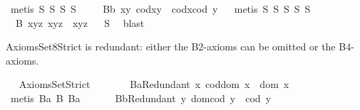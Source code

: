 \begin{isabellebody}
\ {\isacharparenleft}metis\ S{}\ S{}\ S{}\ S{}{\isacharparenright}%
\endisatagproof
{\isafoldproof}%
%
\isadelimproof
%
\endisadelimproof
\isanewline
\ \ \ \isamarkupfalse%
\ B{}b{\isacharcolon}\ {\isachardoublequoteopen}\isactrlbold {\isasymforall}x{\isachardot}\isactrlbold {\isasymforall}y{\isachardot}\ cod{\isacharparenleft}x{\isasymcdot}y{\isacharparenright}\ {\isasymcong}\ cod{\isacharparenleft}x{\isasymcdot}{\isacharparenleft}cod\ y{\isacharparenright}{\isacharparenright}{\isachardoublequoteclose}%
\isadelimproof
\ %
\endisadelimproof
%
\isatagproof
{}\isamarkupfalse%
\ {\isacharparenleft}metis\ S{}\ S{}\ S{}\ S{}\ S{}{\isacharparenright}%
\endisatagproof
{\isafoldproof}%
%
\isadelimproof
%
\endisadelimproof
\isanewline
\ \ \ \isamarkupfalse%
\ \ B{}{\isacharcolon}\ {\isachardoublequoteopen}\isactrlbold {\isasymforall}x{\isachardot}\isactrlbold {\isasymforall}y{\isachardot}\isactrlbold {\isasymforall}z{\isachardot}\ x{\isasymcdot}{\isacharparenleft}y{\isasymcdot}z{\isacharparenright}\ {\isasymcong}\ {\isacharparenleft}x{\isasymcdot}y{\isacharparenright}{\isasymcdot}z{\isachardoublequoteclose}%
\isadelimproof
\ %
\endisadelimproof
%
\isatagproof
{}\isamarkupfalse%
\ S{}\ \isamarkupfalse%
\ blast%
\endisatagproof
{\isafoldproof}%
%
\isadelimproof
%
\endisadelimproof
\isanewline
\ \ \isamarkupfalse%
%
\isamarkuptrue%
%
\begin{isamarkuptext}%
AxiomsSet8Strict is redundant: either the B2-axioms can be omitted or the B4-axioms.%
\end{isamarkuptext}\isamarkuptrue%
\ \isamarkupfalse%
\ AxiomsSet{}Strict\isanewline
\ \ \isanewline
\ \ \ \isamarkupfalse%
\ B{}aRedundant{\isacharcolon}\ {\isachardoublequoteopen}\isactrlbold {\isasymforall}x{\isachardot}\ cod{\isacharparenleft}dom\ x{\isacharparenright}\ {\isasymcong}\ dom\ x\ {\isachardoublequoteclose}%
\isadelimproof
\ %
\endisadelimproof
%
\isatagproof
{}\isamarkupfalse%
\ {\isacharparenleft}metis\ B{}a\ B{}\ B{}a{\isacharparenright}%
\endisatagproof
{\isafoldproof}%
%
\isadelimproof
%
\endisadelimproof
\ \isanewline
\ \ \ \isamarkupfalse%
\ B{}bRedundant{\isacharcolon}\ {\isachardoublequoteopen}\isactrlbold {\isasymforall}y{\isachardot}\ dom{\isacharparenleft}cod\ y{\isacharparenright}\ {\isasymcong}\ cod\ y{\isachardoublequoteclose}%

\end{isabellebody}
